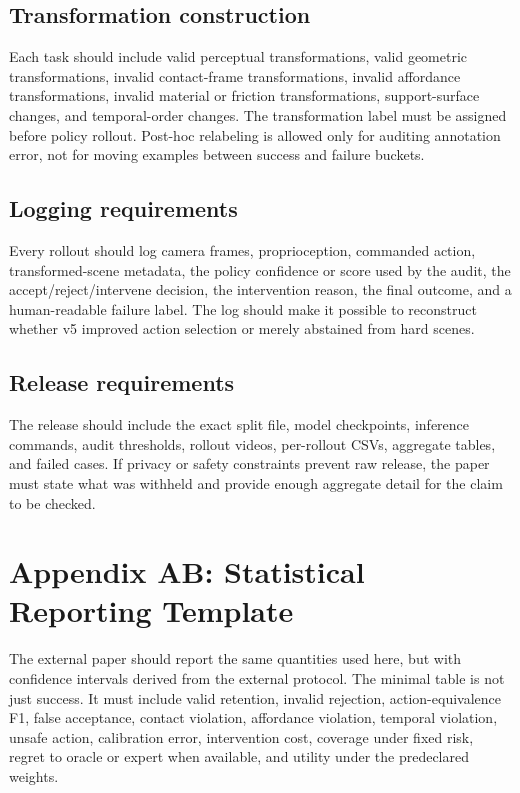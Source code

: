 \documentclass{article}
\begin{document}
\subsection{Transformation construction}
Each task should include valid perceptual transformations, valid geometric transformations, invalid contact-frame transformations, invalid affordance transformations, invalid material or friction transformations, support-surface changes, and temporal-order changes. The transformation label must be assigned before policy rollout. Post-hoc relabeling is allowed only for auditing annotation error, not for moving examples between success and failure buckets.

\subsection{Logging requirements}
Every rollout should log camera frames, proprioception, commanded action, transformed-scene metadata, the policy confidence or score used by the audit, the accept/reject/intervene decision, the intervention reason, the final outcome, and a human-readable failure label. The log should make it possible to reconstruct whether v5 improved action selection or merely abstained from hard scenes.

\subsection{Release requirements}
The release should include the exact split file, model checkpoints, inference commands, audit thresholds, rollout videos, per-rollout CSVs, aggregate tables, and failed cases. If privacy or safety constraints prevent raw release, the paper must state what was withheld and provide enough aggregate detail for the claim to be checked.


\section{Appendix AB: Statistical Reporting Template}
The external paper should report the same quantities used here, but with confidence intervals derived from the external protocol. The minimal table is not just success. It must include valid retention, invalid rejection, action-equivalence F1, false acceptance, contact violation, affordance violation, temporal violation, unsafe action, calibration error, intervention cost, coverage under fixed risk, regret to oracle or expert when available, and utility under the predeclared weights.
\end{document}
